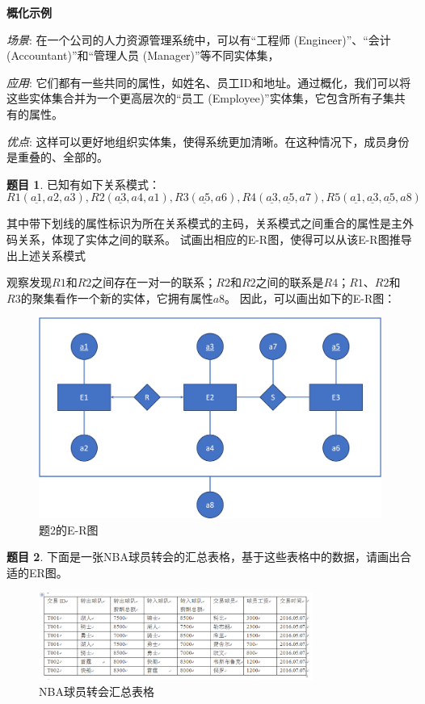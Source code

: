 \documentclass[12pt]{article} %
\makeatletter
\theoremstyle{definition}
\newtheorem{problem}{题目}
\newenvironment{proof}[1][\protect\proofname]{\par
\normalfont\topsep6\p@\@plus6\p@\relax
\trivlist
\itemindent\parindent
\item[\hskip\labelsep
\scshape
#1]\ignorespaces
}{%
\endtrivlist\@endpefalse
}
\renewcommand{\proofname}{\it{解答}}
\makeatother
\begin{document}
\begin{proof}
\vspace{5mm} %

\textbf{概化示例}

\textit{场景}: 在一个公司的人力资源管理系统中，可以有“工程师 (Engineer)”、“会计 (Accountant)”和“管理人员 (Manager)”等不同实体集，

\textit{应用}: 它们都有一些共同的属性，如姓名、员工ID和地址。通过概化，我们可以将这些实体集合并为一个更高层次的“员工 (Employee)”实体集，它包含所有子集共有的属性。

\textit{优点}: 这样可以更好地组织实体集，使得系统更加清晰。在这种情况下，成员身份是重叠的、全部的。

\end{proof}

\begin{problem}
已知有如下关系模式：
\[
R1(\underline{a1},a2, a3),	R2(\underline{a3}, a4,a1) ,		R3(\underline{a5}, a6),
R4(\underline{a3},\underline{a5}, a7),	R5(\underline{a1},\underline{a3},\underline{a5}, a8)
\]

其中带下划线的属性标识为所在关系模式的主码，关系模式之间重合的属性是主外码关系，体现了实体之间的联系。
试画出相应的E-R图，使得可以从该E-R图推导出上述关系模式
\end{problem}  

\begin{proof}
观察发现$R1$和$R2$之间存在一对一的联系；$R2$和$R2$之间的联系是$R4$；$R1$、$R2$和$R3$的聚集看作一个新的实体，它拥有属性$a8$。
因此，可以画出如下的E-R图：
\begin{figure}[H]
  \centering
  \includegraphics[width=1\textwidth]{./figs/2.png}
  \caption{题2的E-R图}
\end{figure}
\end{proof}

\begin{problem}
下面是一张NBA球员转会的汇总表格，基于这些表格中的数据，请画出合适的ER图。 
\begin{figure}[H]
  \centering
  \includegraphics[width=0.8\textwidth]{./figs/3.png}
  \caption{NBA球员转会汇总表格}
\end{figure}
\end{problem}
\end{document}
